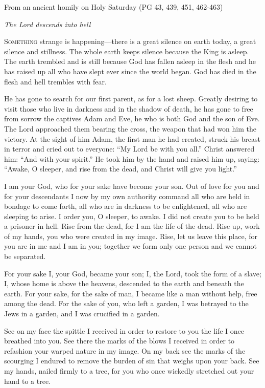 \noindent From an ancient homily on Holy Saturday \hfill(PG 43, 439, 451, 462-463)

\begin{center}\textit{The Lord descends into hell}\end{center}

\lettrine[lines=3,loversize=0.15]{S}{omething} strange is happening—there is a great silence on earth today, a great silence and stillness. The whole earth keeps silence because the King is asleep. The earth trembled and is still because God has fallen asleep in the flesh and he has raised up all who have slept ever since the world began. God has died in the flesh and hell trembles with fear.

He has gone to search for our first parent, as for a lost sheep. Greatly desiring to visit those who live in darkness and in the shadow of death, he has gone to free from sorrow the captives Adam and Eve, he who is both God and the son of Eve. The Lord approached them bearing the cross, the weapon that had won him the victory. At the sight of him Adam, the first man he had created, struck his breast in terror and cried out to everyone: “My Lord be with you all.” Christ answered him: “And with your spirit.” He took him by the hand and raised him up, saying: “Awake, O sleeper, and rise from the dead, and Christ will give you light.”

I am your God, who for your sake have become your son. Out of love for you and for your descendants I now by my own authority command all who are held in bondage to come forth, all who are in darkness to be enlightened, all who are sleeping to arise. I order you, O sleeper, to awake. I did not create you to be held a prisoner in hell. Rise from the dead, for I am the life of the dead. Rise up, work of my hands, you who were created in my image. Rise, let us leave this place, for you are in me and I am in you; together we form only one person and we cannot be separated.

For your sake I, your God, became your son; I, the Lord, took the form of a slave; I, whose home is above the heavens, descended to the earth and beneath the earth. For your sake, for the sake of man, I became like a man without help, free among the dead. For the sake of you, who left a garden, I was betrayed to the Jews in a garden, and I was crucified in a garden.

See on my face the spittle I received in order to restore to you the life I once breathed into you. See there the marks of the blows I received in order to refashion your warped nature in my image. On my back see the marks of the scourging I endured to remove the burden of sin that weighs upon your back. See my hands, nailed firmly to a tree, for you who once wickedly stretched out your hand to a tree.

